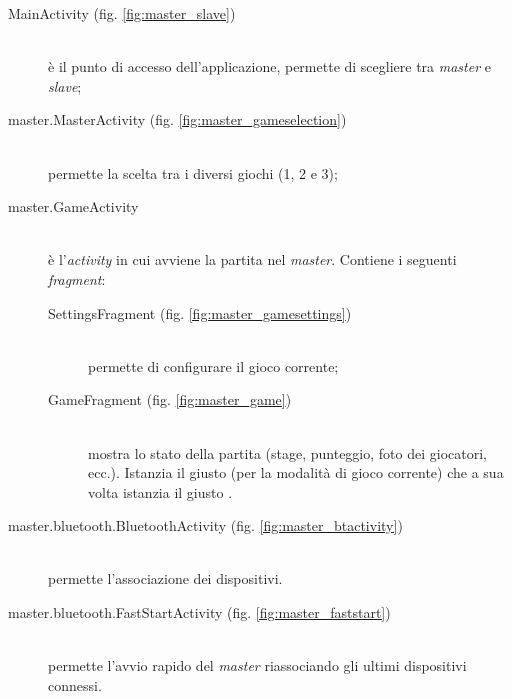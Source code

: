 \begin{description}
\item[MainActivity (fig. \ref{fig:master_slave})]\hfill\\
    è il punto di accesso dell'applicazione, permette di scegliere tra \textit{master} e \textit{slave};


\item[master.MasterActivity (fig. \ref{fig:master_gameselection})]\hfill\\
    permette la scelta tra i diversi giochi (1, 2 e 3);


\item[master.GameActivity]\hfill\\
    è l'\textit{activity} in cui avviene la partita nel \textit{master}. Contiene i seguenti \textit{fragment}:

    \begin{description}
    \item[SettingsFragment (fig. \ref{fig:master_gamesettings})]\hfill\\
        permette di configurare il gioco corrente;


    \item[GameFragment (fig. \ref{fig:master_game})]\hfill\\
        mostra lo stato della partita (stage, punteggio, foto dei giocatori, ecc.). Istanzia il giusto (per la modalità di gioco corrente)  che a sua volta istanzia il giusto .

    \end{description}

\item[master.bluetooth.BluetoothActivity (fig. \ref{fig:master_btactivity})]\hfill\\
    permette l'associazione dei dispositivi.


\item[master.bluetooth.FastStartActivity (fig. \ref{fig:master_faststart})]\hfill\\
    permette l'avvio rapido del \textit{master} riassociando gli ultimi dispositivi connessi.


\end{description}
